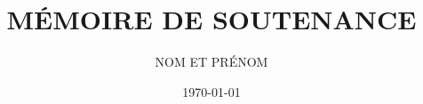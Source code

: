 \documentclass[12pt,a4paper]{ifri}
\begin{document}
\title{MÉMOIRE DE SOUTENANCE}
\author{NOM ET PRÉNOM}
\date{\today}

\maketitle






\tableofcontents
\listoffigures
\listoftables











\end{document}
